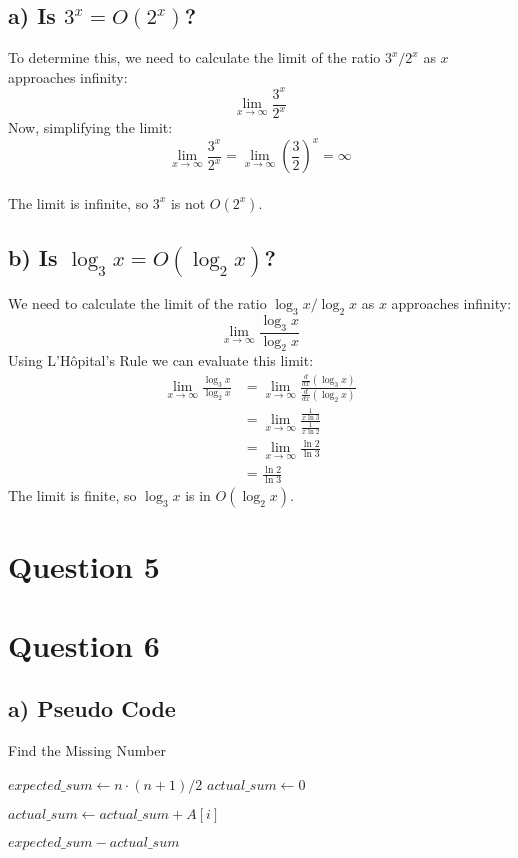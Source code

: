 \documentclass[12pt, letterpaper]{article}
\begin{document}
\subsection{a) Is \(3^x = O(2^x)\)?}
To determine this, we need to calculate the limit of the ratio \(3^x/2^x\) as \(x\) approaches infinity:
\[
\lim_{{x \to \infty}} \frac{3^x}{2^x}
\]
Now, simplifying the limit:
\[
\lim_{{x \to \infty}} \frac{3^x}{2^x} = \lim_{{x \to \infty}} (\frac{3}{2})^x = \infty
\]\\
The limit is infinite, so \(3^x\) is not \(O(2^x)\).

\subsection{b) Is \(\log_3 x = O(\log_2 x)\)?}
We need to calculate the limit of the ratio \(\log_3 x / \log_2 x\) as \(x\) approaches infinity:
\[
\lim_{{x \to \infty}} \frac{\log_3 x}{\log_2 x}
\]
Using L'Hôpital's Rule we can evaluate this limit:
\[
\begin{align*}
\lim_{{x \to \infty}} \frac{\log_3 x}{\log_2 x} &= \lim_{{x \to \infty}} \frac{\frac{d}{dx}(\log_3 x)}{\frac{d}{dx}(\log_2 x)} \\
&= \lim_{{x \to \infty}} \frac{\frac{1}{x \ln 3}}{\frac{1}{x \ln 2}} \\
&= \lim_{{x \to \infty}} \frac{\ln 2}{\ln 3} \\
&= \frac{\ln 2}{\ln 3}
\end{align*}
\]
The limit is finite, so \(\log_3 x\) is in \(O(\log_2 x)\). 
\newpage

\section{Question 5}
\newpage

\section{Question 6}
\subsection{a) Pseudo Code}
\begin{algorithm}
\caption{Find the Missing Number}
\begin{algorithmic}[H]
    \State $expected\_sum \gets n \cdot (n + 1) / 2$
    \State $actual\_sum \gets 0$
    
        \State $actual\_sum \gets actual\_sum + A[i]$
    \EndFor
    
    \State \Return $expected\_sum - actual\_sum$
\EndFunction
\end{algorithmic}
\end{algorithm}
\end{document}
